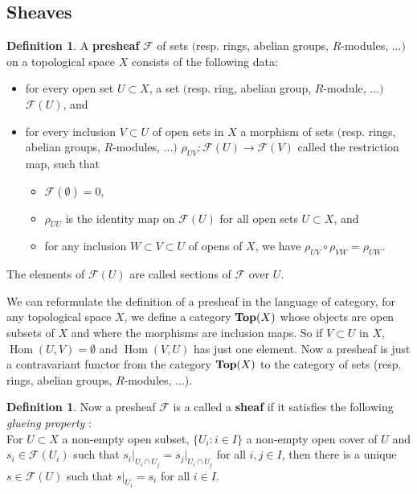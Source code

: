 \documentclass{article}
\theoremstyle{plain}
\theoremstyle{definition}
\newtheorem{definition}[theorem]{Definition}
\DeclareMathOperator{\Hom}{Hom}
\DeclareMathOperator{\Top}{\bf{Top}}
\begin{document}
\subsection{Sheaves}
\label{review_sheaves}
\begin{definition}
    A \textbf{presheaf} $\mathcal{F}$ of sets $($resp. rings, abelian groups, $R$-modules, ...$)$ on a topological space $X$ consists of the following data:
    \begin{itemize}
        \item[$a)$] for every open set $U \subset X$, a set $($resp. ring, abelian group, $R$-module, ...$)$ $\mathcal{F}(U)$, and
        \item[$b)$] for every inclusion $V\subset U$ of open sets in $X$ a morphism of sets $($resp. rings, abelian groups, $R$-modules, ...$)$ $\rho_{UV}:\mathcal{F}(U)\rightarrow\mathcal{F}(V)$ called the restriction map, such that
        \begin{itemize}
            \item[$1)$] $\mathcal{F}(\emptyset) = 0$,
            \item[$2)$] $\rho_{UU}$ is the identity map on $\mathcal{F}(U)$ for all open sets $U\subset X$, and 
            \item[$3)$] for any inclusion $W\subset V\subset U$ of opens of $X$, we have $\rho_{UV}\circ\rho_{VW} = \rho_{UW}$.
        \end{itemize}
    \end{itemize}
    The elements of $\mathcal{F}(U)$ are called sections of $\mathcal{F}$ over $U$.
\end{definition}

\noindent We can reformulate the definition of a presheaf in the language of category, for any topological space $X$, we define a category $\Top(X)$ whose objects are open subsets of $X$ and where the morphisms are inclusion maps. So if $V\subset U$ in $X$, $\Hom(U,V)=\emptyset$ and $\Hom(V,U)$ has just one element.
Now a presheaf is just a contravariant functor from the category $\Top(X)$ to the category of sets (resp. rings, abelian groups, $R$-modules, ...).

\begin{definition}
    Now a presheaf $\mathcal{F}$ is a called a \textbf{sheaf} if it satisfies the following \textit{glueing property} : \\
    For $U\subset X$ a non-empty open subset, $\{U_i : i\in I\}$ a non-empty open cover of $U$ and $s_i\in\mathcal{F}(U_i)$ such that $s_i\vert_{U_i\cap U_j} = s_j\vert_{U_i\cap U_j}$ for all $i,j\in I$, then there is a unique $s\in\mathcal{F}(U)$ such that $s\vert_{U_i} = s_i$ for all $i\in I$.
\end{definition}
\end{document}
